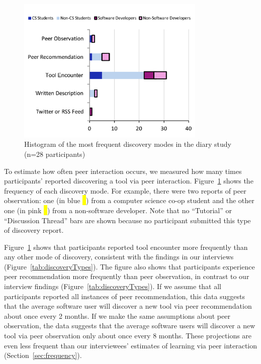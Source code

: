 \documentclass[smallextended]{svjour3}
\newcommand\discpush{peer recommendation\xspace}
\newcommand\discpull{peer observation\xspace}
\begin{document}
 \begin{figure}[t]
 	\centering
 	\begin{center}
 	\includegraphics[width=90mm]{freq}
 	\end{center}
 	\vspace{-5 mm} 
 	\caption{Histogram of the most frequent discovery modes in the diary study (n=28 participants)
	}\label{fig:freq}
\end{figure}





\noindent
To estimate how often peer interaction occurs, we measured how many
times participants' reported discovering a tool via peer interaction.
Figure~\ref{fig:freq} shows the frequency of each discovery mode.
For example, there were two reports of peer observation: one (in blue \hl{~}) 
from a computer science co-op student and the other one (in pink \hl{~}) from a non-software developer.
Note that no ``Tutorial'' or ``Discussion Thread'' bars are shown 
because no participant submitted this type of discovery report. 

Figure~\ref{fig:freq} shows that participants reported tool encounter more frequently than any other mode of discovery, 
consistent with the findings in our interviews (Figure~\ref{tab:discoveryTypes}). 
The figure also shows that participants experience \discpush more frequently than \discpull,
in contrast to our interview findings (Figure~\ref{tab:discoveryTypes}). 
If we assume that all participants reported all instances of peer recommendation,
this data suggests that the average software user will discover a new tool via 
peer recommendation about once every 2 months. %
If we make the same assumptions about peer observation,
the data suggests that the average software users will discover a new tool
via peer observation only about once every 8 months.
These projections are even less frequent than our interviewees' estimates of 
learning via peer interaction (Section~\ref{sec:frequency}).
\end{document}
